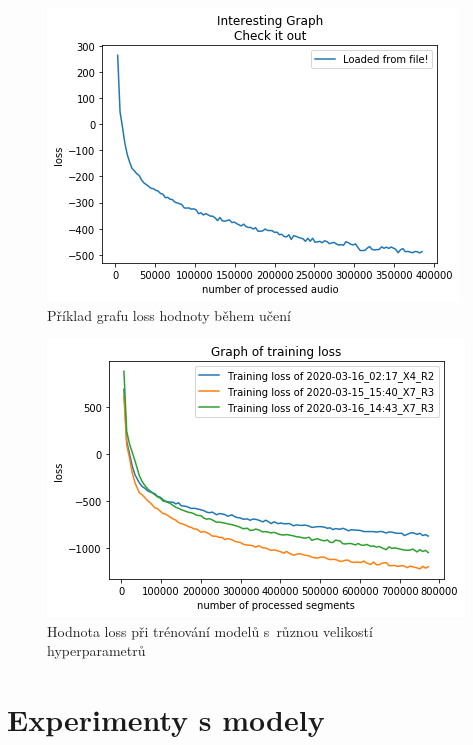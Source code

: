 \begin{figure}[H]
    \centering
    \includegraphics[scale=0.55]{obrazky-figures/some-loss.png}
    \caption{\label{fig:somelossTODO}Příklad grafu loss hodnoty během učení}
\end{figure}

\begin{figure}[H]
    \centering
    \includegraphics[scale=0.55]{obrazky-figures/loss_triple.png}
    \caption{\label{fig:somelossTODO2}Hodnota loss při trénování modelů s~různou velikostí hyperparametrů}
\end{figure}



\section{Experimenty s modely}

